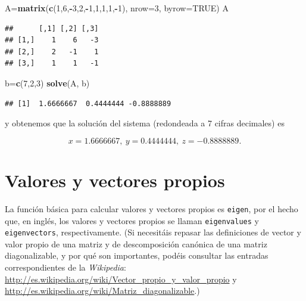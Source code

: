 \documentclass[]{book}
\newenvironment{Shaded}{\begin{snugshade}}{\end{snugshade}}
\newcommand{\DataTypeTok}[1]{\textcolor[rgb]{0.13,0.29,0.53}{#1}}
\newcommand{\DecValTok}[1]{\textcolor[rgb]{0.00,0.00,0.81}{#1}}
\newcommand{\KeywordTok}[1]{\textcolor[rgb]{0.13,0.29,0.53}{\textbf{#1}}}
\newcommand{\NormalTok}[1]{#1}
\newcommand{\OperatorTok}[1]{\textcolor[rgb]{0.81,0.36,0.00}{\textbf{#1}}}
\newcommand{\OtherTok}[1]{\textcolor[rgb]{0.56,0.35,0.01}{#1}}
\theoremstyle{definition}
\theoremstyle{definition}
\theoremstyle{definition}
\theoremstyle{remark}
\begin{document}
\begin{Shaded}
\begin{Highlighting}[]
\NormalTok{A=}\KeywordTok{matrix}\NormalTok{(}\KeywordTok{c}\NormalTok{(}\DecValTok{1}\NormalTok{,}\DecValTok{6}\NormalTok{,}\OperatorTok{-}\DecValTok{3}\NormalTok{,}\DecValTok{2}\NormalTok{,}\OperatorTok{-}\DecValTok{1}\NormalTok{,}\DecValTok{1}\NormalTok{,}\DecValTok{1}\NormalTok{,}\DecValTok{1}\NormalTok{,}\OperatorTok{-}\DecValTok{1}\NormalTok{), }\DataTypeTok{nrow=}\DecValTok{3}\NormalTok{, }\DataTypeTok{byrow=}\OtherTok{TRUE}\NormalTok{)}
\NormalTok{A}
\end{Highlighting}
\end{Shaded}

\begin{verbatim}
##      [,1] [,2] [,3]
## [1,]    1    6   -3
## [2,]    2   -1    1
## [3,]    1    1   -1
\end{verbatim}

\begin{Shaded}
\begin{Highlighting}[]
\NormalTok{b=}\KeywordTok{c}\NormalTok{(}\DecValTok{7}\NormalTok{,}\DecValTok{2}\NormalTok{,}\DecValTok{3}\NormalTok{)}
\KeywordTok{solve}\NormalTok{(A, b)}
\end{Highlighting}
\end{Shaded}

\begin{verbatim}
## [1]  1.6666667  0.4444444 -0.8888889
\end{verbatim}

y obtenemos que la solución del sistema (redondeada a 7 cifras decimales) es

\[
x=1.6666667, \ y=0.4444444, \ z=-0.8888889.
\]

\hypertarget{valores-y-vectores-propios}{%
\section{Valores y vectores propios}\label{valores-y-vectores-propios}}

La función básica para calcular valores y vectores propios es \texttt{eigen}, por el hecho que, en inglés, los valores y vectores propios se llaman \texttt{eigenvalues} y \texttt{eigenvectors}, respectivamente. (Si necesitáis repasar las definiciones de vector y valor propio de una matriz y de descomposición canónica de una matriz diagonalizable, y por qué son importantes, podéis consultar las entradas correspondientes de la \emph{Wikipedia}:
\url{http://es.wikipedia.org/wiki/Vector_propio_y_valor_propio}
y \url{http://es.wikipedia.org/wiki/Matriz_diagonalizable}.)
\end{document}
